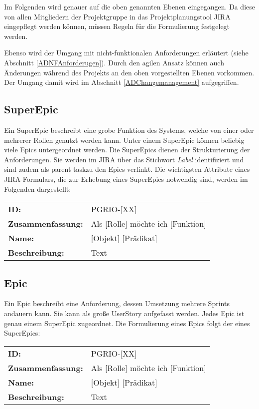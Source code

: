 Im Folgenden wird genauer auf die oben genannten Ebenen eingegangen. Da diese von allen Mitgliedern der Projektgruppe in das Projektplanungstool JIRA eingepflegt werden können, müssen Regeln für die Formulierung festgelegt werden. 

Ebenso wird der Umgang mit nicht-funktionalen Anforderungen erläutert (siehe Abschnitt \ref{ADNFAnforderugen}). Durch den agilen Ansatz können auch Änderungen während des Projekts an den oben vorgestellten Ebenen vorkommen. Der Umgang damit wird im Abschnitt \ref{ADChangemanagement} aufgegriffen.

\subsection{SuperEpic}\label{ADSuperEpic}
Ein SuperEpic beschreibt eine grobe Funktion des Systems, welche von einer oder mehrerer Rollen genutzt werden kann. Unter einem SuperEpic können beliebig viele Epics untergeordnet werden. Die SuperEpics dienen der Strukturierung der Anforderungen. Sie werden im JIRA über das Stichwort \textit{Label} identifiziert und sind zudem als \glqq parent task\grqq  zu den Epics verlinkt. Die wichtigsten Attribute eines JIRA-Formulars, die zur Erhebung eines SuperEpics notwendig sind, werden im Folgenden dargestellt:

\begin{flushleft}
\begin{tabular}{ll}
\textbf{ID:} & PGRIO-[XX] \\
\textbf{Zusammenfassung:} & Als [Rolle] möchte ich [Funktion]\\
\textbf{Name:} & [Objekt] [Prädikat] \\
\textbf{Beschreibung:} & Text \\
\end{tabular}
\end{flushleft}

\subsection{Epic}\label{ADEpic}
Ein Epic beschreibt eine Anforderung, dessen Umsetzung mehrere Sprints andauern kann. Sie kann als \glqq große UserStory \grqq aufgefasst werden. Jedes Epic ist genau einem SuperEpic zugeordnet. Die Formulierung eines Epics folgt der eines SuperEpics:

\begin{flushleft}
\begin{tabular}{ll}
\textbf{ID:} & PGRIO-[XX] \\
\textbf{Zusammenfassung:} & Als [Rolle] möchte ich [Funktion]\\
\textbf{Name:} & [Objekt] [Prädikat] \\
\textbf{Beschreibung:} & Text \\
\end{tabular}
\end{flushleft}

